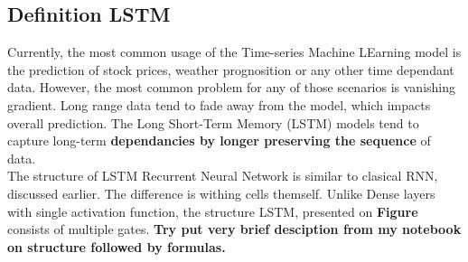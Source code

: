 \subsection{Definition LSTM}\label{sec:LSTM}
    Currently, the most common usage of the Time-series Machine LEarning model is the prediction of stock prices, weather prognosition or any other time dependant data.
    However, the most common problem for any of those scenarios is vanishing gradient.
    Long range data tend to fade away from the model, which impacts overall prediction.
    The Long Short-Term Memory (LSTM) models tend to capture long-term \textbf{dependancies by longer preserving the sequence} of data. \\
    The structure of LSTM Recurrent Neural Network is similar to clasical RNN, discussed earlier.
    The difference is withing cells themself.
    Unlike Dense layers with single activation function, the structure LSTM, presented on \textbf{Figure} consists of multiple gates.
    \textbf{Try put very brief desciption from my notebook on structure followed by formulas.} \\ [2 pc]
